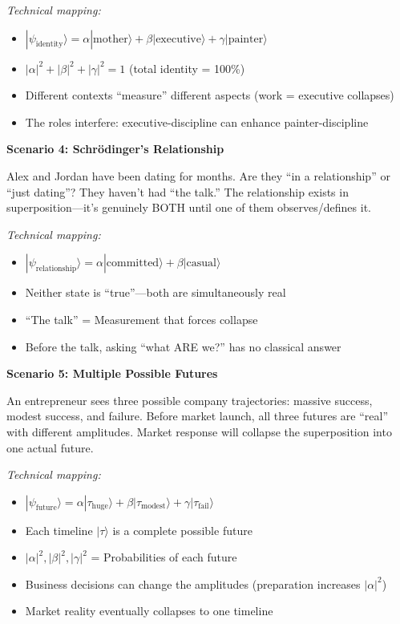 \documentclass[11pt,twoside]{book}
\begin{document}
\begin{tcolorbox}[colback=yellow!5!white,colframe=yellow!65!black,title=\textbf{Real-Life Scenarios: Quantum Superposition},breakable]
\textit{Technical mapping:}
\begin{itemize}
    \item $|\psi_{\mathrm{identity}}\rangle = \alpha|\text{mother}\rangle + \beta|\text{executive}\rangle + \gamma|\text{painter}\rangle$
    \item $|\alpha|^2 + |\beta|^2 + |\gamma|^2 = 1$ (total identity = 100\%)
    \item Different contexts ``measure'' different aspects (work = executive collapses)
    \item The roles interfere: executive-discipline can enhance painter-discipline
\end{itemize}

\textbf{Scenario 4: Schr\"{o}dinger's Relationship}

Alex and Jordan have been dating for months. Are they ``in a relationship'' or ``just dating''? They haven't had ``the talk.'' The relationship exists in superposition---it's genuinely BOTH until one of them observes/defines it.

\textit{Technical mapping:}
\begin{itemize}
    \item $|\psi_{\mathrm{relationship}}\rangle = \alpha|\text{committed}\rangle + \beta|\text{casual}\rangle$
    \item Neither state is ``true''---both are simultaneously real
    \item ``The talk'' = Measurement that forces collapse
    \item Before the talk, asking ``what ARE we?'' has no classical answer
\end{itemize}

\textbf{Scenario 5: Multiple Possible Futures}

An entrepreneur sees three possible company trajectories: massive success, modest success, and failure. Before market launch, all three futures are ``real'' with different amplitudes. Market response will collapse the superposition into one actual future.

\textit{Technical mapping:}
\begin{itemize}
    \item $|\psi_{\mathrm{future}}\rangle = \alpha|\tau_{\text{huge}}\rangle + \beta|\tau_{\text{modest}}\rangle + \gamma|\tau_{\text{fail}}\rangle$
    \item Each timeline $|\tau\rangle$ is a complete possible future
    \item $|\alpha|^2, |\beta|^2, |\gamma|^2$ = Probabilities of each future
    \item Business decisions can change the amplitudes (preparation increases $|\alpha|^2$)
    \item Market reality eventually collapses to one timeline
\end{itemize}

\end{tcolorbox}
\end{document}
